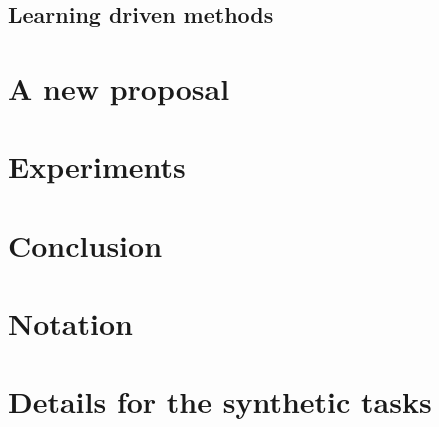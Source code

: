 \documentclass[english,laurea,twoside,10pt]{UFtesi}
\theoremstyle{definition}
\theoremstyle{definition}
\theoremstyle{definition}
\begin{document}
  \section{Learning driven methods}
  
  
  
  
  
\chapter{A new proposal}
  
\chapter{Experiments}
  \label{ch:experiments}
   
  
  
 \chapter{Conclusion}


%   

\appendix
\chapter{Notation}

\chapter{Details for the synthetic tasks}
\label{app:tasks}



\newpage
{}

\end{document}
